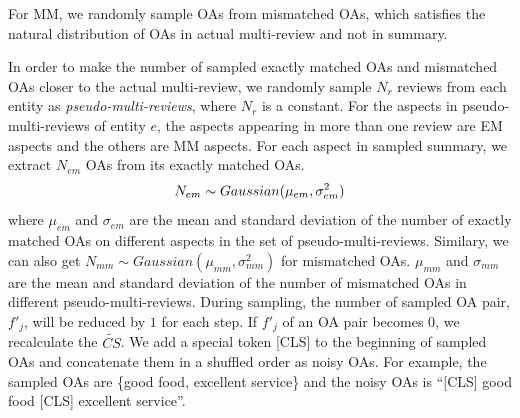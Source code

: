 {%
For MM,
we randomly sample OAs from mismatched OAs,
which satisfies the natural distribution
of OAs in actual multi-review 
and not in summary.

In order to make the number of sampled exactly matched OAs and
mismatched OAs closer to the actual multi-review,
we randomly sample $N_r$ reviews from each entity
as {\em pseudo-multi-reviews}, 
where $N_r$ is a constant.
For the aspects in pseudo-multi-reviews of entity $e$, 
the aspects appearing in more than one review are EM aspects
and the others are MM aspects.
For each aspect in sampled summary, 
we extract $N_{em}$ OAs from its exactly matched OAs.
\begin{equation}
	\small
N_{em} \sim Gaussian(\mu_{em}, \sigma_{em}^2)
\end{equation}
where $\mu_{em}$ and $\sigma_{em}$ are the mean and standard deviation of
the number of exactly matched OAs on different aspects 
in the set of pseudo-multi-reviews.
Similary, we can also get 
$N_{mm} \sim Gaussian(\mu_{mm}, \sigma_{mm}^2)$ 
for mismatched OAs.
$\mu_{mm}$ and $\sigma_{mm}$ are the mean and standard deviation of
the number of mismatched OAs in different pseudo-multi-reviews.
During sampling, the number of sampled OA pair, $f'_j$, will be 
reduced by $1$ for each step.
If $f'_j$ of an OA pair becomes $0$,
we recalculate the $\widetilde{CS}$.
We add a special token [CLS] to the beginning of 
sampled OAs and concatenate them in a shuffled order as noisy OAs. 
For example, the sampled OAs are \{good food, excellent service\} 
and the noisy OAs is ``[CLS] good food [CLS] excellent service''.

}
